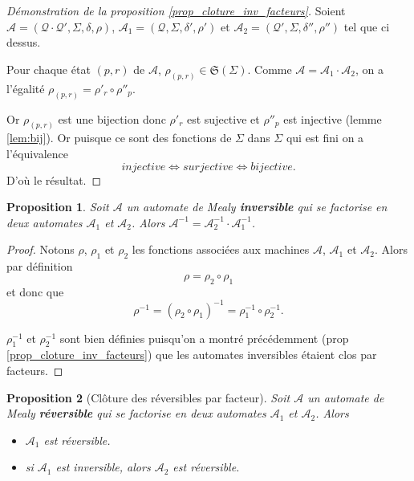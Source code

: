 \documentclass[11pt,a4paper]{article}
\newtheorem{prop}{Proposition}
\begin{document}
\begin{proof}[Démonstration de la proposition \ref{prop_cloture_inv_facteurs}]
  Soient $\mathcal{A}=\left(\mathcal{Q\cdot Q'}, \Sigma, \delta, \rho\right)$, $\mathcal{A}_1=\left(\mathcal{Q}, \Sigma, \delta', \rho'\right)$ et $\mathcal{A}_2=\left(\mathcal{Q'}, \Sigma, \delta'', \rho''\right)$ tel que ci dessus.

  Pour chaque état $(p, r)$ de $\mathcal{A}$, $\rho_{(p, r)}\in \mathfrak{S}(\Sigma)$. Comme $\mathcal{A}=\mathcal{A}_1\cdot\mathcal{A}_2$, on a l'égalité $\rho_{(p, r)}=\rho'_r\circ\rho''_p$.

  Or $\rho_{(p, r)}$ est une bijection donc $\rho'_r$ est sujective et $\rho''_p$ est injective (lemme \ref{lem:bij}). Or puisque ce sont des fonctions de $\Sigma$ dans $\Sigma$ qui est fini on a l'équivalence
  \[ injective \iff surjective \iff bijective. \]
  D'où le résultat.
\end{proof}

\begin{prop}\label{prop_inverse_produit}
    Soit $\mathcal{A}$ un automate de Mealy \textbf{inversible} qui se factorise en deux automates $\mathcal{A}_1$ et $\mathcal{A}_2$.
    Alors $\mathcal{A}^{-1} = \mathcal{A}_2^{-1} \cdot \mathcal{A}_1^{-1}$.
\end{prop}

\begin{proof}
  Notons $\rho$, $\rho_1$ et $\rho_2$ les fonctions associées aux machines $\mathcal{A}$, $\mathcal{A}_1$ et $\mathcal{A}_2$. Alors par définition \[ \rho = \rho_2\circ\rho_1 \] et donc que \[ \rho^{-1} = \left(\rho_2\circ\rho_1\right)^{-1} = \rho_1^{-1}\circ\rho_2^{-1}. \]

  $\rho_1^{-1}$ et $\rho_2^{-1}$ sont bien définies puisqu'on a montré précédemment (prop \ref{prop_cloture_inv_facteurs}) que les automates inversibles étaient clos par facteurs.
\end{proof}

\begin{prop}[Clôture des réversibles par facteur]\label{prop_cloture_rev_facteurs}
  Soit $\mathcal{A}$ un automate de Mealy \textbf{réversible} qui se factorise en deux automates $\mathcal{A}_1$ et $\mathcal{A}_2$. Alors
  \begin{itemize}
  \item $\mathcal{A}_1$ est réversible.
  \item si $\mathcal{A}_1$ est inversible, alors $\mathcal{A}_2$ est réversible.
  \end{itemize}
\end{prop}
\end{document}
